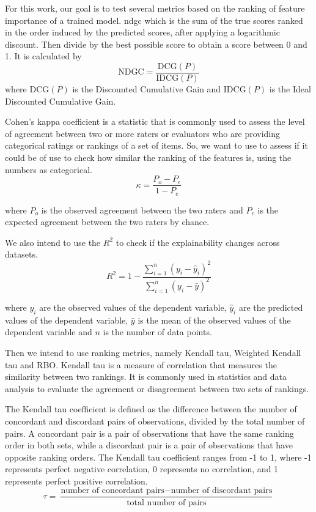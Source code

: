 For this work, our goal is to test several metrics based on the ranking of feature importance of a trained model. \ac{ndgc} \cite{wangTheoreticalAnalysisNDCG} which is the sum of the true scores ranked in the order induced by the predicted scores, after applying a logarithmic discount. Then divide by the best possible score to obtain a score between 0 and 1. It is calculated by
\begin{equation}
\text{{NDGC}} = \frac{{\text{{DCG}}(P)}}{{\text{{IDCG}}(P)}}
\end{equation}
where $\text{{DCG}}(P)$ is the Discounted Cumulative Gain and $\text{{IDCG}}(P)$ is the Ideal Discounted Cumulative Gain. 

Cohen's kappa coefficient \cite{doi:10.1177/001316446002000104} is a statistic that is commonly used to assess the level of agreement between two or more raters or evaluators who are providing categorical ratings or rankings of a set of items. So, we want to use to assess if it could be of use to check how similar the ranking of the features is, using the numbers as categorical.
\begin{equation}
\kappa = \frac{{P_o - P_e}}{{1 - P_e}}
\end{equation}

where \(P_o\) is the observed agreement between the two raters and \(P_e\) is the expected agreement between the two raters by chance.

We also intend to use the $R^2$ to check if the explainability changes across datasets.
\begin{equation}
R^2 = 1 - \frac{{\sum_{i=1}^n (y_i - \hat{y}_i)^2}}{{\sum_{i=1}^n (y_i - \bar{y})^2}}
\end{equation}


where \(y_i\) are the observed values of the dependent variable, \(\hat{y}_i\) are the predicted values of the dependent variable, \(\bar{y}\) is the mean of the observed values of the dependent variable and \(n\) is the number of data points.

Then we intend to use ranking metrics, namely Kendall tau, Weighted Kendall tau and RBO.
Kendall tau is a measure of correlation that measures the similarity between two rankings. It is commonly used in statistics and data analysis to evaluate the agreement or disagreement between two sets of rankings.

The Kendall tau coefficient \cite{kendallTreatmentTiesRanking1945} is defined as the difference between the number of concordant and discordant pairs of observations, divided by the total number of pairs. A concordant pair is a pair of observations that have the same ranking order in both sets, while a discordant pair is a pair of observations that have opposite ranking orders. The Kendall tau coefficient ranges from -1 to 1, where -1 represents perfect negative correlation, 0 represents no correlation, and 1 represents perfect positive correlation. 
\begin{equation}
\tau = \frac{{\text{{number of concordant pairs}} - \text{{number of discordant pairs}}}}{{\text{{total number of pairs}}}}
\end{equation}

